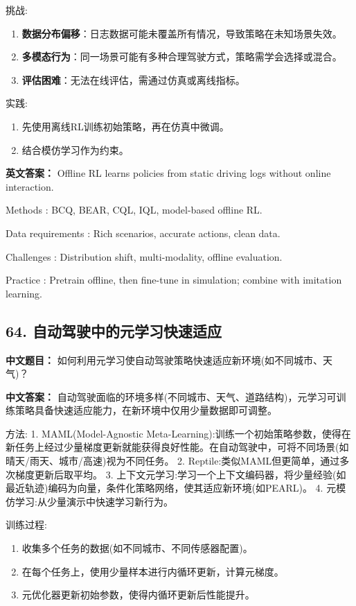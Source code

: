 \documentclass[10pt,a4paper]{ctexart}
\begin{document}
 挑战:
\begin{enumerate}
    \item \textbf{数据分布偏移}：日志数据可能未覆盖所有情况，导致策略在未知场景失效。
    \item \textbf{多模态行为}：同一场景可能有多种合理驾驶方式，策略需学会选择或混合。
    \item \textbf{评估困难}：无法在线评估，需通过仿真或离线指标。
\end{enumerate}

 实践:
\begin{enumerate}
    \item 先使用离线RL训练初始策略，再在仿真中微调。
    \item 结合模仿学习作为约束。
\end{enumerate}

\textbf{英文答案：}  
Offline RL learns policies from static driving logs without online interaction.

 Methods : BCQ, BEAR, CQL, IQL, model-based offline RL.

 Data requirements : Rich scenarios, accurate actions, clean data.

 Challenges : Distribution shift, multi-modality, offline evaluation.

 Practice : Pretrain offline, then fine-tune in simulation; combine with imitation learning.

\subsection*{64. 自动驾驶中的元学习快速适应}
\textbf{中文题目：} 如何利用元学习使自动驾驶策略快速适应新环境(如不同城市、天气)？

\textbf{中文答案：}  
自动驾驶面临的环境多样(不同城市、天气、道路结构)，元学习可训练策略具备快速适应能力，在新环境中仅用少量数据即可调整。

 方法:
1.  MAML(Model-Agnostic Meta-Learning):训练一个初始策略参数，使得在新任务上经过少量梯度更新就能获得良好性能。在自动驾驶中，可将不同场景(如晴天/雨天、城市/高速)视为不同任务。
2.  Reptile:类似MAML但更简单，通过多次梯度更新后取平均。
3.  上下文元学习:学习一个上下文编码器，将少量经验(如最近轨迹)编码为向量，条件化策略网络，使其适应新环境(如PEARL)。
4.  元模仿学习:从少量演示中快速学习新行为。

 训练过程:
\begin{enumerate}
    \item 收集多个任务的数据(如不同城市、不同传感器配置)。
    \item 在每个任务上，使用少量样本进行内循环更新，计算元梯度。
    \item 元优化器更新初始参数，使得内循环更新后性能提升。
\end{enumerate}
\end{document}
